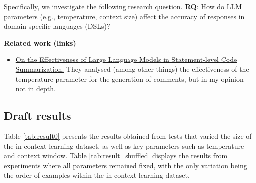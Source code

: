 Specifically, we investigate the following research question.
\textbf{RQ}: How do LLM parameters (e.g., temperature, context size) affect the accuracy of responses in domain-specific languages (DSLs)?

\textbf{Related work (links)}
\begin{itemize}
    \item \href{https://ieeexplore.ieee.org/document/10684656}{On the Effectiveness of Large Language Models in Statement-level Code Summarization.} They analysed (among other things) the effectiveness of the temperature parameter for the generation of comments, but in my opinion not in depth.
\end{itemize}

\subsection{Draft results}

Table \ref{tab:result0} presents the results obtained from tests that varied the size of the in-context learning dataset, as well as key parameters such as temperature and context window.
Table \ref{tab:result_shuffled} displays the results from experiments where all parameters remained fixed, with the only variation being the order of examples within the in-context learning dataset.

